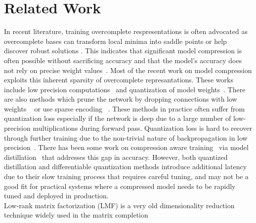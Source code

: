\section{Related Work} 
\label{sec:related}
In recent literature, training overcomplete respresentations is often advocated as overcomplete bases can transform local minima into saddle points \cite{dauphin2014identifying} or help discover robust solutions \cite{lewicki2000learning}. This indicates that significant model compression is often possible without sacrificing accuracy and that the model's accuracy does not rely
on precise weight values~\cite{keskar2016large}. Most of the recent work on model compression exploits this inherent sparsity of overcomplete represantations. These works include low precision computations~\cite{anwar2015fixed,courbariaux2014low} and quantization of model weights~\cite{han2015deep,zhou2017incremental}. There are also methods which
prune the network by dropping connections with low weights ~\cite{wen2016learning,see2016compression} or use sparse encoding ~\cite{han2015learning}. These methods in practice often suffer from quantization loss especially if the network is deep due to a large number of low-precision multiplications during forward pass. Quantization loss is hard to recover through further training due to the non-trivial nature of backpropagation in low precision~\cite{lin2015neural}. There has been some work on compression aware training~\cite{polino2018model} via model distillation~\cite{hinton2015distilling} that addresses this gap in accuracy. However, both quantized distillation and differentiable quantization methods introduce additional latency due to their slow training process that requires careful tuning, and may not be a good fit for practical systems where a compressed model needs to be rapidly tuned and deployed in production. \\
Low-rank matrix factorization (LMF) is a very old dimensionality reduction technique widely used in the matrix completion
